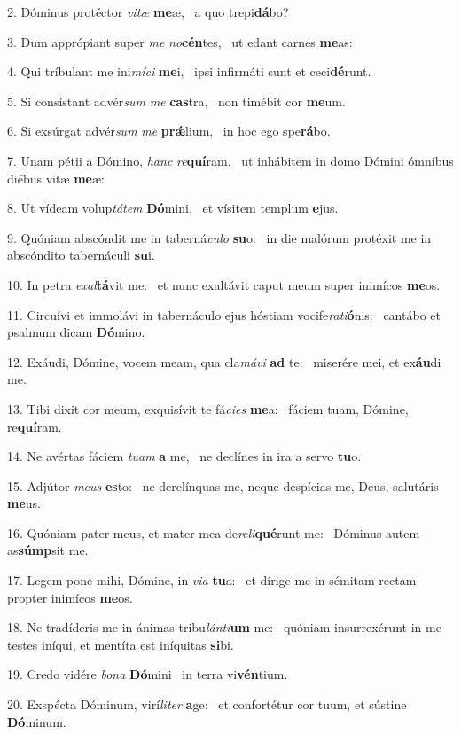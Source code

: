 2. Dóminus protéctor \textit{vi}\textit{tæ} \textbf{me}æ, \ast\  a quo trepi\textbf{dá}bo?\

3. Dum apprópiant super \textit{me} \textit{no}\textbf{cén}tes, \ast\  ut edant carnes \textbf{me}as:\

4. Qui tríbulant me ini\textit{mí}\textit{ci} \textbf{me}i, \ast\  ipsi infirmáti sunt et ceci\textbf{dé}runt.\

5. Si consístant advér\textit{sum} \textit{me} \textbf{cas}tra, \ast\  non timébit cor \textbf{me}um.\

6. Si exsúrgat advér\textit{sum} \textit{me} \textbf{prǽ}lium, \ast\  in hoc ego spe\textbf{rá}bo.\

7. Unam pétii a Dómino, \textit{hanc} \textit{re}\textbf{quí}ram, \ast\  ut inhábitem in domo Dómini ómnibus diébus vitæ \textbf{me}æ:\

8. Ut vídeam volup\textit{tá}\textit{tem} \textbf{Dó}mini, \ast\  et vísitem templum \textbf{e}jus.\

9. Quóniam abscóndit me in taberná\textit{cu}\textit{lo} \textbf{su}o: \ast\  in die malórum protéxit me in abscóndito tabernáculi \textbf{su}i.\

10. In petra \textit{ex}\textit{al}\textbf{tá}vit me: \ast\  et nunc exaltávit caput meum super inimícos \textbf{me}os.\

11. Circuívi et immolávi in tabernáculo ejus hóstiam vocife\textit{ra}\textit{ti}\textbf{ó}nis: \ast\  cantábo et psalmum dicam \textbf{Dó}mino.\

12. Exáudi, Dómine, vocem meam, qua cla\textit{má}\textit{vi} \textbf{ad} te: \ast\  miserére mei, et ex\textbf{áu}di me.\

13. Tibi dixit cor meum, exquisívit te fá\textit{ci}\textit{es} \textbf{me}a: \ast\  fáciem tuam, Dómine, re\textbf{quí}ram.\

14. Ne avértas fáciem \textit{tu}\textit{am} \textbf{a} me, \ast\  ne declínes in ira a servo \textbf{tu}o.\

15. Adjútor \textit{me}\textit{us} \textbf{es}to: \ast\  ne derelínquas me, neque despícias me, Deus, salutáris \textbf{me}us.\

16. Quóniam pater meus, et mater mea de\textit{re}\textit{li}\textbf{qué}runt me: \ast\  Dóminus autem as\textbf{súmp}sit me.\

17. Legem pone mihi, Dómine, in \textit{vi}\textit{a} \textbf{tu}a: \ast\  et dírige me in sémitam rectam propter inimícos \textbf{me}os.\

18. Ne tradíderis me in ánimas tribu\textit{lán}\textit{ti}\textbf{um} me: \ast\  quóniam insurrexérunt in me testes iníqui, et mentíta est iníquitas \textbf{si}bi.\

19. Credo vidére \textit{bo}\textit{na} \textbf{Dó}mini \ast\  in terra vi\textbf{vén}tium.\

20. Exspécta Dóminum, virí\textit{li}\textit{ter} \textbf{a}ge: \ast\  et confortétur cor tuum, et sústine \textbf{Dó}minum.\

